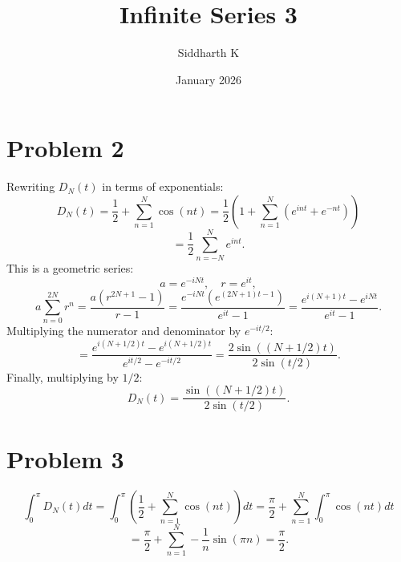 \documentclass{article}
\title{Infinite Series 3}
\author{Siddharth K}
\date{January 2026}
\newcommand{\bigp}[1]{\left(#1\right)}
\begin{document}
\maketitle

\section*{Problem 2}
Rewriting $D_N(t)$ in terms of exponentials:
$$D_N(t) = \frac{1}{2} + \sum_{n = 1}^N \cos(nt) = \frac{1}{2}\bigp{1 + \sum_{n = 1}^N (e^{int} + e^{-nt})}$$
$$= \frac{1}{2}\sum_{n = -N}^N e^{int}.$$
This is a geometric series:
$$a = e^{-iNt}, \quad r = e^{it},$$
$$a\sum_{n = 0}^{2N}r^n = \frac{a(r^{2N + 1} - 1)}{r - 1} = \frac{e^{-iNt}(e^{(2N + 1)t - 1})}{e^{it} - 1} = \frac{e^{i(N + 1)t} - e^{iNt}}{e^{it} - 1}.$$
Multiplying the numerator and denominator by $e^{-it/2}$:
$$= \frac{e^{i(N + 1/2)t} - e^{i(N + 1/2)t}}{e^{it/2} - e^{-it/2}} = \frac{2\sin((N + 1/2)t)}{2\sin(t/2)}.$$
Finally, multiplying by $1/2$:
$$D_N(t) = \frac{\sin((N + 1/2)t)}{2\sin(t/2)}.$$

\section*{Problem 3}
$$\int_0^\pi D_N(t)dt = \int_0^{\pi} \bigp{\frac{1}{2} + \sum_{n = 1}^N \cos(nt)}dt = \frac{\pi}{2} + \sum_{n = 1}^N \int_0^\pi \cos(nt)dt$$
$$= \frac{\pi}{2} + \sum_{n = 1}^N -\frac{1}{n}\sin(\pi n) = \frac{\pi}{2}.$$
\end{document}
